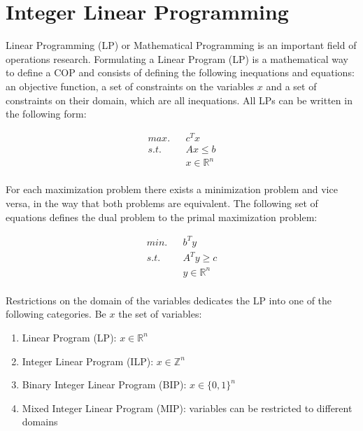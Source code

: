 \section{Integer Linear Programming}
Linear Programming (LP) or Mathematical Programming is an important field of operations research. Formulating a Linear Program (LP) is a mathematical way to define a COP and consists of defining the following inequations and equations: an objective function, a set of constraints on the variables $x$ and a set of constraints on their domain, which are all inequations.  All LPs can be written in the following form:

\begin{equation*}
\begin{aligned}
max. && c^Tx            \\
s.t. && Ax \leq b       \\
&& x \in \mathbb{R}^n \\
\end{aligned}
\end{equation*}

For each maximization problem there exists a minimization problem and vice versa, in the way that both problems are equivalent. The following set of equations defines the dual problem to the primal maximization problem:

\begin{equation*}
\begin{aligned}
min. && b^Ty            \\
s.t. && A^Ty \geq c       \\
&& y \in \mathbb{R}^n 	\\
\end{aligned}
\end{equation*}

Restrictions on the domain of the variables dedicates the LP into one of the following categories. Be $x$ the set of variables:
\begin{enumerate}
\item Linear Program (LP): $x \in \mathbb{R}^n$
\item Integer Linear Program (ILP): $x \in \mathbb{Z}^n$
\item Binary Integer Linear Program (BIP): $x \in \{0,1\}^n$
\item Mixed Integer Linear Program (MIP): variables can be restricted to different domains
\end{enumerate}

